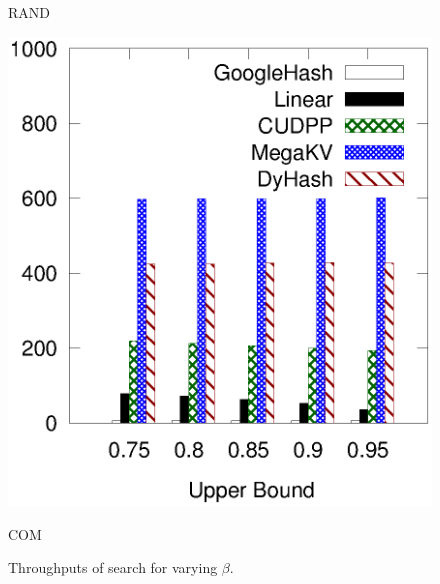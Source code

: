 \begin{figure}[t]
\begin{minipage}{0.19\linewidth}
		\centerline{RAND}
	\end{minipage}
	\hfill
	\begin{minipage}{0.19\linewidth}\centering
		\includegraphics[width=\linewidth]{pic/static-upper/upper_search_ali.eps}
		\centerline{COM}
	\end{minipage}
	\caption{Throughputs of search for varying $\beta$.}
	\label{fig:static:all:search}
\end{figure}

